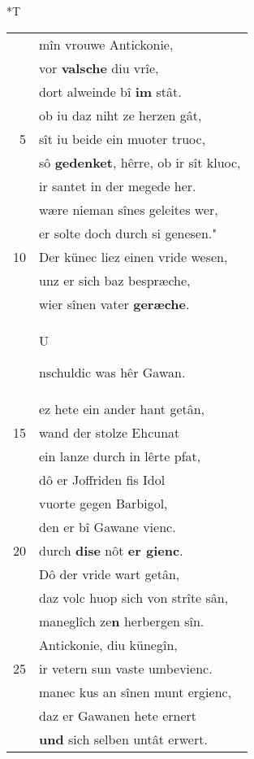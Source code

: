 \documentclass[8pt,a4paper,notitlepage]{article}
\begin{document}
\begin{table}[ht]
\begin{minipage}[t]{0.5\linewidth}
\end{minipage}
\hspace{0.5cm}
\begin{minipage}[t]{0.5\linewidth}
\small
\begin{center}*T
\end{center}
\begin{tabular}{rl}
 & mîn vrouwe Antickonie,\\ 
 & vor \textbf{valsche} diu vrîe,\\ 
 & dort alweinde bî \textbf{im} stât.\\ 
 & ob iu daz niht ze herzen gât,\\ 
5 & sît iu beide ein muoter truoc,\\ 
 & sô \textbf{gedenket}, hêrre, ob ir sît kluoc,\\ 
 & ir santet in der megede her.\\ 
 & wære nieman sînes geleites wer,\\ 
 & er solte doch durch si genesen."\\ 
10 & Der künec liez einen vride wesen,\\ 
 & unz er sich baz bespræche,\\ 
 & wier sînen vater \textbf{geræche}.\\ 
 & \begin{large}U\end{large}nschuldic was hêr Gawan.\\ 
 & ez hete ein ander hant getân,\\ 
15 & wand der stolze Ehcunat\\ 
 & ein lanze durch in lêrte pfat,\\ 
 & dô er Joffriden fis Idol\\ 
 & vuorte gegen Barbigol,\\ 
 & den er bî Gawane vienc.\\ 
20 & durch \textbf{dise} nôt \textbf{er gienc}.\\ 
 & Dô der vride wart getân,\\ 
 & daz volc huop sich von strîte sân,\\ 
 & maneglîch ze\textbf{n} herbergen sîn.\\ 
 & Antickonie, diu künegîn,\\ 
25 & ir vetern sun vaste umbevienc.\\ 
 & manec kus an sînen munt ergienc,\\ 
 & daz er Gawanen hete ernert\\ 
 & \textbf{und} sich selben untât erwert.\\ 

\end{tabular}
\end{minipage}
\end{table}
\end{document}
